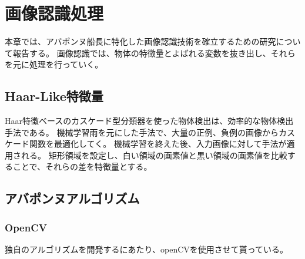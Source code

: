 \section{画像認識処理}

本章では、アバポンヌ船長に特化した画像認識技術を確立するための研究について報告する。
画像認識では、物体の特徴量とよばれる変数を抜き出し、それらを元に処理を行っていく。

\subsection{Haar-Like特徴量}
Haar特徴ベースのカスケード型分類器を使った物体検出\cite{990517}は、効率的な物体検出手法である。
機械学習雨を元にした手法で、大量の正例、負例の画像からカスケード関数を最適化してく。
機械学習を終えた後、入力画像に対して手法が適用される。
矩形領域を設定し、白い領域の画素値と黒い領域の画素値を比較することで、それらの差を特徴量とする。

\subsection{アバポンヌアルゴリズム}
\subsubsection{OpenCV}
独自のアルゴリズムを開発するにあたり、openCVを使用させて貰っている。
